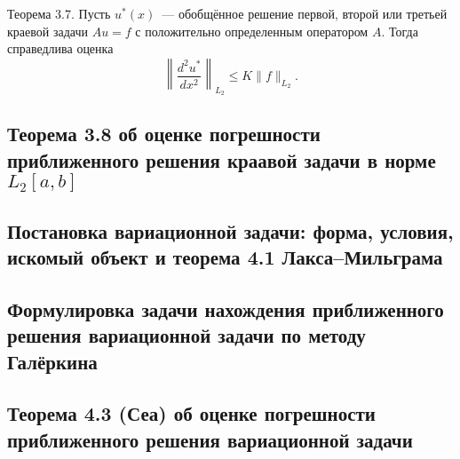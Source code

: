 \documentclass[a4paper,14pt]{article} %
\begin{document}
Теорема 3.7. Пусть $u^*(x)$~--- обобщённое решение первой,
второй или третьей краевой задачи $Au = f$
с положительно определенным оператором $A$.
Тогда справедлива оценка
\begin{equation}
	\left\|
		\frac{d^2 u^*}{dx^2}
	\right\|_{L_2}
	\leq K \|f\|_{L_2}
	.
\end{equation}


\subsection{Теорема 3.8 об оценке погрешности приближенного решения краавой задачи в норме $L_2[a,b]$}

\subsection{Постановка вариационной задачи: форма, условия, искомый объект и теорема 4.1 Лакса--Мильграма}

\subsection{Формулировка задачи нахождения приближенного решения вариационной задачи по методу Галёркина}

\subsection{Теорема 4.3 (Сеа) об оценке погрешности приближенного решения вариационной задачи}
\end{document}
